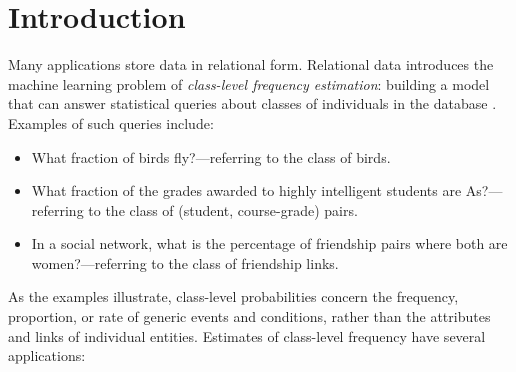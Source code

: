 \documentclass[oribibl]{llncs}
\begin{document}
\section{Introduction} \label{sec:intro}
Many applications store data in relational form. 
Relational data introduces the machine learning problem of {\em class-level frequency estimation}: building a model that can answer statistical queries about classes of individuals in the database \cite{Getoor2001}. Examples of such queries include:

\begin{itemize}
\item What fraction of birds fly?---referring to the class of birds.
\item What fraction of the grades awarded to highly intelligent students are As?---referring to the class of (student, course-grade) pairs.
\item In a social network, what is the percentage of friendship pairs where both are women?---referring to the class of friendship links. 
\end{itemize}

As the examples illustrate, class-level probabilities concern the frequency, proportion, or rate of generic events and conditions, rather than the attributes and links of individual entities.
Estimates of class-level frequency have several applications:
\end{document}
